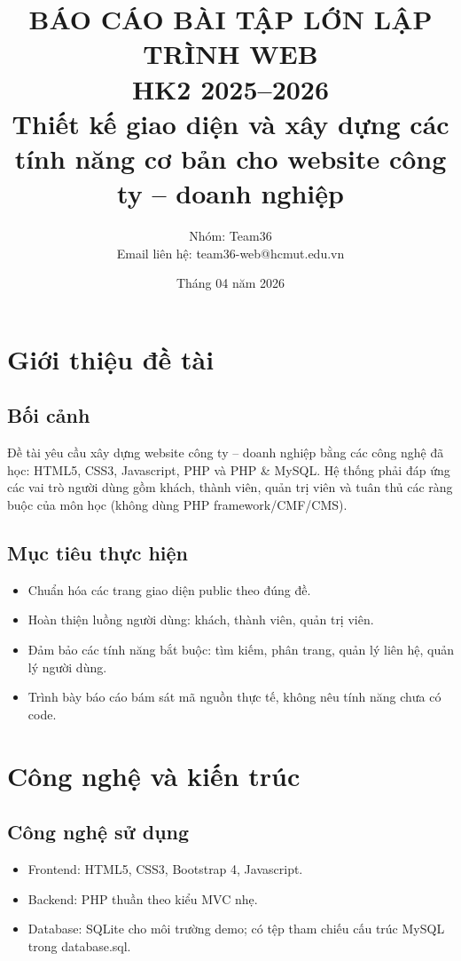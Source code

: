 \documentclass[12pt,a4paper]{article}
\title{\textbf{BÁO CÁO BÀI TẬP LỚN LẬP TRÌNH WEB}\\
HK2 2025--2026\\
\large Thiết kế giao diện và xây dựng các tính năng cơ bản cho website công ty -- doanh nghiệp}
\author{Nhóm: Team36\\
Email liên hệ: team36-web@hcmut.edu.vn}
\date{Tháng 04 năm 2026}
\begin{document}
\maketitle
\tableofcontents
\newpage

\section{Giới thiệu đề tài}

\subsection{Bối cảnh}
Đề tài yêu cầu xây dựng website công ty -- doanh nghiệp bằng các công nghệ đã học: HTML5, CSS3, Javascript, PHP và PHP \& MySQL. Hệ thống phải đáp ứng các vai trò người dùng gồm khách, thành viên, quản trị viên và tuân thủ các ràng buộc của môn học (không dùng PHP framework/CMF/CMS).

\subsection{Mục tiêu thực hiện}
\begin{itemize}
  \item Chuẩn hóa các trang giao diện public theo đúng đề.
  \item Hoàn thiện luồng người dùng: khách, thành viên, quản trị viên.
  \item Đảm bảo các tính năng bắt buộc: tìm kiếm, phân trang, quản lý liên hệ, quản lý người dùng.
  \item Trình bày báo cáo bám sát mã nguồn thực tế, không nêu tính năng chưa có code.
\end{itemize}

\section{Công nghệ và kiến trúc}

\subsection{Công nghệ sử dụng}
\begin{itemize}
  \item Frontend: HTML5, CSS3, Bootstrap 4, Javascript.
  \item Backend: PHP thuần theo kiểu MVC nhẹ.
  \item Database: SQLite cho môi trường demo; có tệp tham chiếu cấu trúc MySQL trong database.sql.
\end{itemize}
\end{document}

